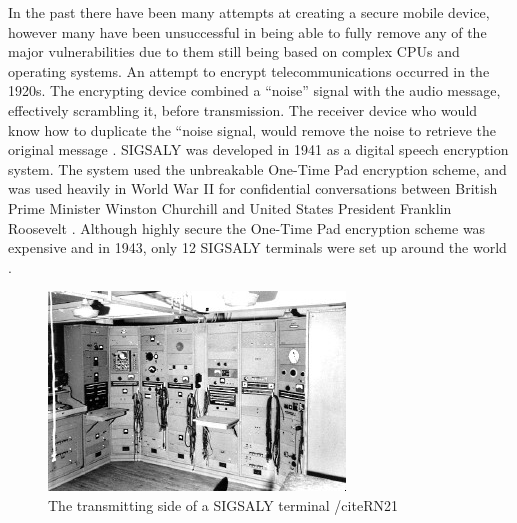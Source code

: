 	In the past there have been many attempts at creating a secure mobile device, however many have been unsuccessful in being able to fully remove any of the major vulnerabilities due to them still being based on complex CPUs and operating systems. 
	An attempt to encrypt telecommunications occurred in the 1920s. The encrypting device combined a “noise” signal with the audio message, effectively scrambling it, before transmission. The receiver device who would know how to duplicate the “noise signal, would remove the noise to retrieve the original message \cite{RN30}.
	SIGSALY was developed in 1941 as a digital speech encryption system. The system used the unbreakable One-Time Pad encryption scheme, and was used heavily in World War II for confidential conversations between British Prime Minister Winston Churchill and United States President Franklin Roosevelt \cite{RN21}. Although highly secure the One-Time Pad encryption scheme was expensive and in 1943, only 12 SIGSALY terminals were set up around the world \cite{RN21}.

\begin{figure}
	\includegraphics[width=\linewidth]{terminal.jpg}
	\caption{The transmitting side of a SIGSALY terminal /cite{RN21}}
	\label{fig:SIGSALY}
\end{figure}

